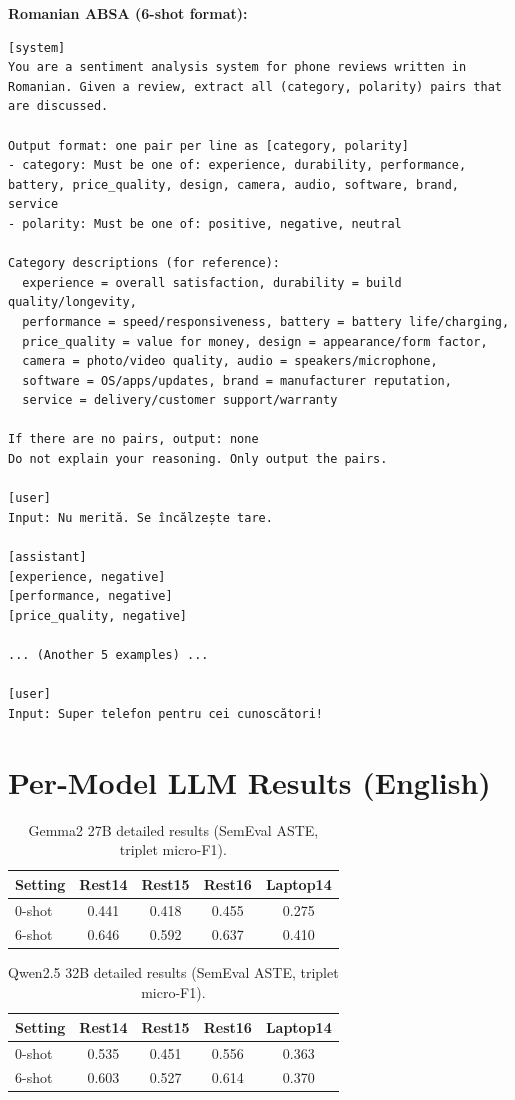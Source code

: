 \documentclass[12pt,a4paper]{report}
\begin{document}
\textbf{Romanian ABSA (6-shot format):}
\begin{lstlisting}
[system]
You are a sentiment analysis system for phone reviews written in Romanian. Given a review, extract all (category, polarity) pairs that are discussed.

Output format: one pair per line as [category, polarity]
- category: Must be one of: experience, durability, performance, battery, price_quality, design, camera, audio, software, brand, service
- polarity: Must be one of: positive, negative, neutral

Category descriptions (for reference):
  experience = overall satisfaction, durability = build quality/longevity,
  performance = speed/responsiveness, battery = battery life/charging,
  price_quality = value for money, design = appearance/form factor,
  camera = photo/video quality, audio = speakers/microphone,
  software = OS/apps/updates, brand = manufacturer reputation,
  service = delivery/customer support/warranty

If there are no pairs, output: none
Do not explain your reasoning. Only output the pairs.

[user]
Input: Nu merită. Se încălzește tare.

[assistant]
[experience, negative]
[performance, negative]
[price_quality, negative]

... (Another 5 examples) ...

[user]
Input: Super telefon pentru cei cunoscători!
\end{lstlisting}

\section{Per-Model LLM Results (English)}

\begin{table}[H]
\centering
\caption{Gemma2 27B detailed results (SemEval ASTE, triplet micro-F1).}
\small
\begin{tabular}{@{}lcccc@{}}
\toprule
\textbf{Setting} & \textbf{Rest14} & \textbf{Rest15} & \textbf{Rest16} & \textbf{Laptop14} \\
\midrule
0-shot & 0.441 & 0.418 & 0.455 & 0.275 \\
6-shot & 0.646 & 0.592 & 0.637 & 0.410 \\
\bottomrule
\end{tabular}
\end{table}

\begin{table}[H]
\centering
\caption{Qwen2.5 32B detailed results (SemEval ASTE, triplet micro-F1).}
\small
\begin{tabular}{@{}lcccc@{}}
\toprule
\textbf{Setting} & \textbf{Rest14} & \textbf{Rest15} & \textbf{Rest16} & \textbf{Laptop14} \\
\midrule
0-shot & 0.535 & 0.451 & 0.556 & 0.363 \\
6-shot & 0.603 & 0.527 & 0.614 & 0.370 \\
\bottomrule
\end{tabular}
\end{table}
\end{document}
